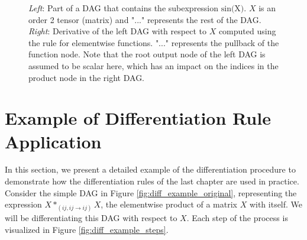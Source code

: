 \documentclass[12pt, a4paper]{report}
\begin{document}
\begin{figure}
    \centering
    \begin{minipage}{7cm}
        \centering
    \end{minipage}
    \begin{minipage}{7cm}
        \centering
    \end{minipage}
    \caption{\textit{Left}: Part of a DAG that contains the subexpression $\text{sin(X)}$. $X$ is an order 2 tensor (matrix) and "..." represents the rest of the DAG. \textit{Right}: Derivative of the left DAG with respect to $X$ computed using the rule for elementwise functions. "..." represents the pullback of the function node. Note that the root output node of the left DAG is assumed to be scalar here, which has an impact on the indices in the product node in the right DAG.}
    \label{fig:func_rule}
\end{figure}

\FloatBarrier
\section{Example of Differentiation Rule Application}
In this section, we present a detailed example of the differentiation procedure to demonstrate how the differentiation rules of the last chapter are used in practice.
Consider the simple DAG in Figure \ref{fig:diff_example_original}, representing the expression $X *_{(ij,ij \rightarrow ij)} X$, the elementwise product of a matrix $X$ with itself.
We will be differentiating this DAG with respect to $X$.
Each step of the process is visualized in Figure \ref{fig:diff_example_steps}.
\end{document}
